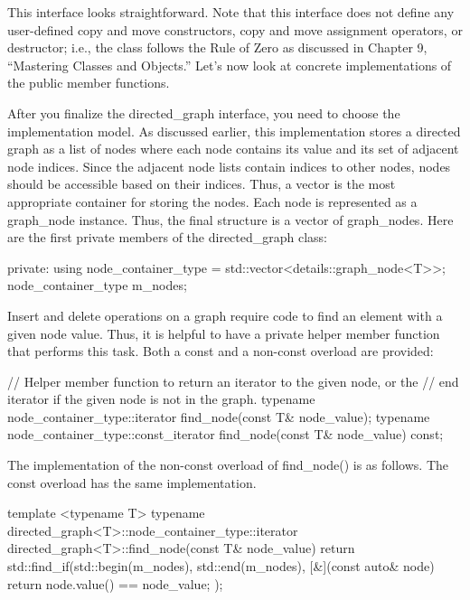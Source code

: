 This interface looks straightforward. Note that this interface does not define any user-defined copy and move constructors, copy and move assignment operators, or destructor; i.e., the class follows the Rule of Zero as discussed in Chapter 9, “Mastering Classes and Objects.” Let’s now look at concrete implementations of the public member functions.


After you finalize the directed\_graph interface, you need to choose the implementation model. As discussed earlier, this implementation stores a directed graph as a list of nodes where each node contains its value and its set of adjacent node indices. Since the adjacent node lists contain indices to other nodes, nodes should be accessible based on their indices. Thus, a vector is the most appropriate container for storing the nodes. Each node is represented as a graph\_node instance. Thus, the final structure is a vector of graph\_nodes. Here are the first private members of the directed\_graph class:

\begin{cpp}
private:
    using node_container_type = std::vector<details::graph_node<T>>;
    node_container_type m_nodes;
\end{cpp}


Insert and delete operations on a graph require code to find an element with a given node value. Thus, it is helpful to have a private helper member function that performs this task. Both a const and a non-const overload are provided:

\begin{cpp}
// Helper member function to return an iterator to the given node, or the
// end iterator if the given node is not in the graph.
typename node_container_type::iterator find_node(const T& node_value);
typename node_container_type::const_iterator find_node(const T& node_value) const;
\end{cpp}

The implementation of the non-const overload of find\_node() is as follows. The const overload has the same implementation.

\begin{cpp}
template <typename T>
typename directed_graph<T>::node_container_type::iterator
    directed_graph<T>::find_node(const T& node_value)
{
    return std::find_if(std::begin(m_nodes), std::end(m_nodes),
        [&](const auto& node) { return node.value() == node_value; });
}
\end{cpp}

